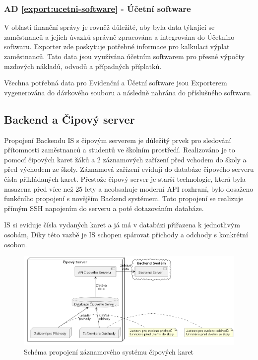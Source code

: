 \documentclass[FM,Proj]{tulthesis}
\begin{document}
\subsubsection*{AD \ref{export:ucetni-software} - Účetní software}
V oblasti finanční správy je rovněž důležité, aby byla data týkající se zaměstnanců a jejich
úvazků správně zpracována a integrována do Účetního softwaru. Exporter zde poskytuje potřebné
informace pro kalkulaci výplat zaměstnanců. Tato data jsou využívána účetním softwarem pro 
přesné výpočty mzdových nákladů, odvodů a případných příplatků.

Všechna potřebná data pro Evidenční a Účetní software jsou Exporterem vygenerována 
do dávkového souboru a následně nahrána do příslušného softwaru. 

\subsection{Backend a Čipový server}
\label{section:backend-a-cipovy-server}
Propojení Backendu IS s čipovým serverem je důležitý prvek pro sledování přítomnosti
zaměstnanců a studentů ve školním prostředí. Realizováno je to pomocí čipových karet žáků
a 2 záznamových zařízení před vchodem do školy a před východem ze školy. Záznamová zařízení
evidují do databáze čipového serveru čísla přikládaných karet. Přestože čipový 
server je starší technologie, která byla nasazena před více než 25 lety a neobsahuje 
moderní API rozhraní, bylo dosaženo funkčního propojení s novějším Backend systémem. 
Toto propojení se realizuje přímým SSH napojením do serveru a poté dotazováním databáze.

IS si eviduje čísla vydaných karet a já má v databázi přiřazena k jednotlivým osobám,
Díky této vazbě je IS schopen spárovat příchody a odchody s konkrétní osobou.

\begin{figure}[H]
    \includegraphics[width=\textwidth-28pt]{backend-cipovy-server.png}
    \caption{Schéma propojení záznamového systému čipových karet}
    \label{fig:backend-cipovy-server}
\end{figure}
\end{document}
